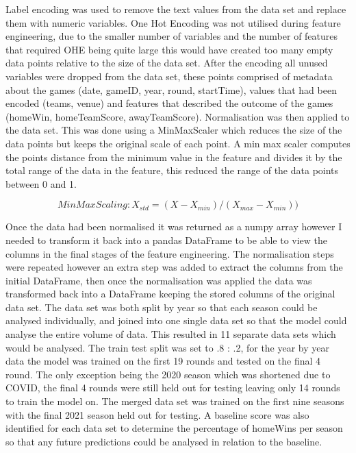 \documentclass{imc-inf}
\begin{document}
	Label encoding was used to remove the text values from the data set and replace them with numeric variables. One Hot Encoding was not utilised during feature engineering, due to the smaller number of variables and the number of features that required OHE being quite large this would have created too many empty data points relative to the size of the data set. After the encoding all unused variables were dropped from the data set, these points comprised of metadata about the games (date, gameID, year, round, startTime), values that had been encoded (teams, venue) and features that described the outcome of the games (homeWin, homeTeamScore, awayTeamScore). Normalisation was then applied to the data set. This was done using a MinMaxScaler which reduces the size of the data points but keeps the original scale of each point. A min max scaler computes the points distance from the minimum value in the feature and divides it by the total range of the data in the feature, this reduced the range of the data points between 0 and 1.
	
	\begin{equation}
		Min Max Scaling: X_{std} = (X - X_{min}) / (X_{max} - X_{min}))
	\end{equation}
	
	Once the data had been normalised it was returned as a numpy array however I needed to transform it back into a pandas DataFrame to be able to view the columns in the final stages of the feature engineering. The normalisation steps were repeated however an extra step was added to extract the columns from the initial DataFrame, then once the normalisation was applied the data was transformed back into a DataFrame keeping the stored columns of the original data set.
	The data set was both split by year so that each season could be analysed individually, and joined into one single data set so that the model could analyse the entire volume of data. This resulted in 11 separate data sets which would be analysed. The train test split was set to .8 : .2, for the year by year data the model was trained on the first 19 rounds and tested on the final 4 round. The only exception being the 2020 season which was shortened due to COVID, the final 4 rounds were still held out for testing leaving only 14 rounds to train the model on. The merged data set was trained on the first nine seasons with the final 2021 season held out for testing. A baseline score was also identified for each data set to determine the percentage of homeWins per season so that any future predictions could be analysed in relation to the baseline. 
	\newline
	
\end{document}
